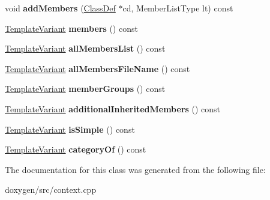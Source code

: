 \begin{DoxyCompactItemize}
void {\bfseries add\+Members} (\mbox{\hyperlink{class_class_def}{Class\+Def}} $\ast$cd, Member\+List\+Type lt) const
\item 
\mbox{\label{class_class_context_1_1_private_a614bf9b12dc845f54f736a2f32cbbc59}} 
\mbox{\hyperlink{class_template_variant}{Template\+Variant}} {\bfseries members} () const
\item 
\mbox{\label{class_class_context_1_1_private_aa2b7806666bd2ef7792b36dc7df1b150}} 
\mbox{\hyperlink{class_template_variant}{Template\+Variant}} {\bfseries all\+Members\+List} () const
\item 
\mbox{\label{class_class_context_1_1_private_a5b74a4b13dfe9f8912bc8d4489893215}} 
\mbox{\hyperlink{class_template_variant}{Template\+Variant}} {\bfseries all\+Members\+File\+Name} () const
\item 
\mbox{\label{class_class_context_1_1_private_ad7c3d7b9ca28ca49108040a100e72ad1}} 
\mbox{\hyperlink{class_template_variant}{Template\+Variant}} {\bfseries member\+Groups} () const
\item 
\mbox{\label{class_class_context_1_1_private_a57d80cd5170e14a7c7ddbda7768c7d6b}} 
\mbox{\hyperlink{class_template_variant}{Template\+Variant}} {\bfseries additional\+Inherited\+Members} () const
\item 
\mbox{\label{class_class_context_1_1_private_ac994d6d08b233fb3ef5390f02bdd1218}} 
\mbox{\hyperlink{class_template_variant}{Template\+Variant}} {\bfseries is\+Simple} () const
\item 
\mbox{\label{class_class_context_1_1_private_a9592d397f3b4fff3a365b08ee4ef5d24}} 
\mbox{\hyperlink{class_template_variant}{Template\+Variant}} {\bfseries category\+Of} () const
\end{DoxyCompactItemize}


The documentation for this class was generated from the following file\+:\begin{DoxyCompactItemize}
\item 
doxygen/src/context.\+cpp\end{DoxyCompactItemize}

